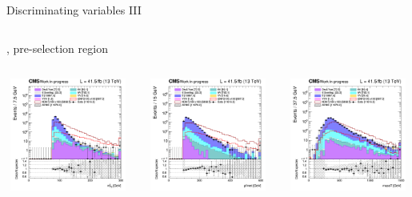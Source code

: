 \documentclass[8pt]{beamer}
\begin{document}
\begin{frame}{Discriminating variables III}
\begin{columns}
\begin{column}{1.09\textwidth}
\begin{block}{, pre-selection region}\end{block} \vspace{5pt}
\end{column}
\end{columns} \vspace{-5pt}
\begin{columns}
		\begin{column}{0.33\textwidth}
			\begin{center}
     			\includegraphics[width=1.0\textwidth, height=105pt]{figs/2017/SmearSR-ttDM-scalar100/log_cratio_topCR_ll_mt2ll.png}
    		\end{center}		
		\end{column} 
		\begin{column}{0.33\textwidth}
			\begin{center}
     			\includegraphics[width=1.0\textwidth, height=105pt]{figs/2017/SmearSR-ttDM-scalar100/log_cratio_topCR_ll_METcorrected_pt.png}
    		\end{center}		
		\end{column} 
		\begin{column}{0.33\textwidth}
			\begin{center}
     			\includegraphics[width=1.0\textwidth, height=105pt]{figs/2017/SmearSR-ttDM-scalar100/log_cratio_topCR_ll_massT.png}

\end{center}
\end{column}
\end{columns}
\end{frame}
\end{document}
